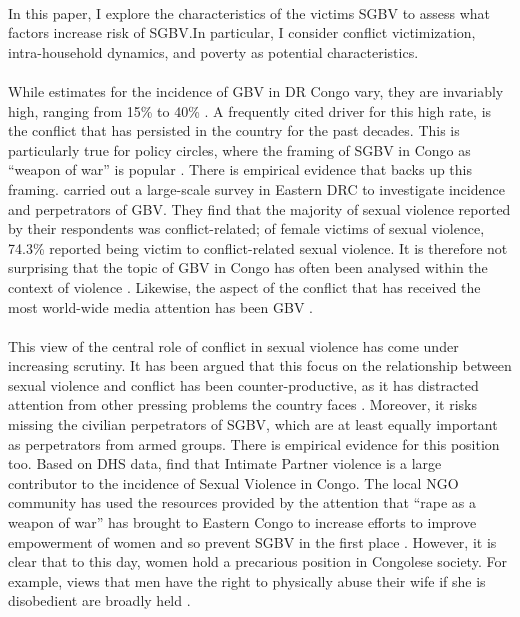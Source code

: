 \documentclass[11pt,a4paper]{scrartcl} %
\begin{document}
\paragraph{}
In this paper, I explore the characteristics of the victims SGBV to assess what factors increase risk of SGBV.In particular, I consider conflict victimization, intra-household dynamics, and poverty as potential characteristics.

\paragraph{}
While estimates for the incidence of GBV in DR Congo vary, they are invariably high, ranging from 15\% to 40\% \citep{Johnson2010,Peterman2011}. A frequently cited driver for this high rate, is the conflict that has persisted in the country for the past decades. This is particularly true for policy circles, where the framing of SGBV in Congo as ``weapon of war'' is popular \citep{Baaz2013,Kirby2015}. There is empirical evidence that backs up this framing. \cite{Johnson2010} carried out a large-scale survey in Eastern DRC to investigate incidence and perpetrators of GBV. They find that the majority of sexual violence reported by their respondents was conflict-related; of female victims of sexual violence, 74.3\% reported being victim to conflict-related sexual violence. It is therefore not surprising that the topic of GBV in Congo has often been analysed within the context of violence \citep{Baaz2013}. Likewise, the aspect of the conflict that has received the most world-wide media attention has been GBV \citep{Autesserre2012a}.  
\paragraph{}
This view of the central role of conflict in sexual violence has come under increasing scrutiny. It has been argued that this focus on the relationship between sexual violence and conflict has been counter-productive, as it has distracted attention from other pressing problems the country faces \citep{Autesserre2012a, Hilhorst2018,Porter2019}. Moreover, it risks missing the civilian perpetrators of SGBV, which are at least equally important as perpetrators from armed groups. There is empirical evidence for this position too. Based on DHS data, \cite{Peterman2011} find that Intimate Partner violence is a large contributor to the incidence of Sexual Violence in Congo. The local NGO community has used the resources provided by the attention that ``rape as a weapon of war'' has brought to Eastern Congo to increase efforts to improve empowerment of women and so prevent SGBV in the first place \citep{Hilhorst2018}. However, it is clear that to this day, women hold a precarious position in Congolese society. For example, views that men have the right to physically abuse their wife if she is disobedient are broadly held \citep{Quattrochi2019}.
\end{document}
